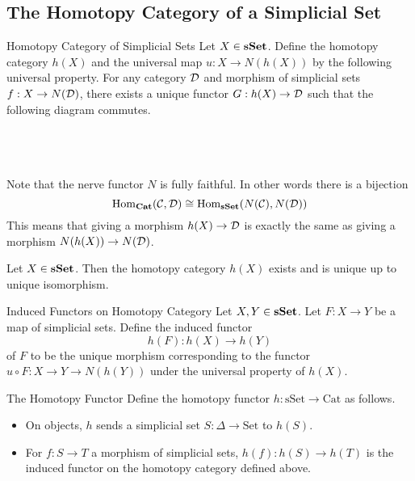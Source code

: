 \documentclass[a4paper]{article}
\begin{document}
\subsection{The Homotopy Category of a Simplicial Set}
\begin{defn}{Homotopy Category of Simplicial Sets}{} Let $X\in\bold{sSet}$. Define the homotopy category $h(X)$ and the universal map $u:X\to N(h(X))$ by the following universal property. For any category $\mathcal{D}$ and morphism of simplicial sets $f:X\to N(\mathcal{D})$, there exists a unique functor $G:h(X)\to\mathcal{D}$ such that the following diagram commutes. \\~\\
\\~\\
\end{defn}

Note that the nerve functor $N$ is fully faithful. In other words there is a bijection $$\operatorname{Hom}_\bold{Cat}(\mathcal{C},\mathcal{D})\cong\operatorname{Hom}_\bold{sSet}(N(\mathcal{C}),N(\mathcal{D}))$$ This means that giving a morphism $h(X)\to\mathcal{D}$ is exactly the same as giving a morphism $N(h(X))\to N(\mathcal{D})$. 

\begin{lmm}{}{} Let $X\in\bold{sSet}$. Then the homotopy category $h(X)$ exists and is unique up to unique isomorphism. 
\end{lmm}

\begin{defn}{Induced Functors on Homotopy Category}{} Let $X,Y\in\bold{sSet}$. Let $F:X\to Y$ be a map of simplicial sets. Define the induced functor $$h(F):h(X)\to h(Y)$$ of $F$ to be the unique morphism corresponding to the functor $u\circ F:X\to Y\to N(h(Y))$ under the universal property of $h(X)$. 
\end{defn}

\begin{defn}{The Homotopy Functor}{} Define the homotopy functor $h:\text{sSet}\to\text{Cat}$ as follows. 
\begin{itemize}
\item On objects, $h$ sends a simplicial set $S:\Delta\to\text{Set}$ to $h(S)$. 
\item For $f:S\to T$ a morphism of simplicial sets, $h(f):h(S)\to h(T)$ is the induced functor on the homotopy category defined above. 
\end{itemize}
\end{defn}
\end{document}
